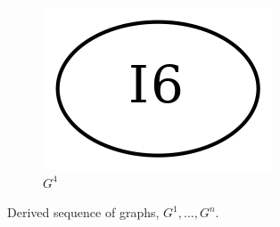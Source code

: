 \documentclass[aspectratio=1610]{beamer}
\begin{document}
\begin{frame}
\begin{figure}[htbp]
\begin{subfigure}[b]{0.06\textwidth}
			\includegraphics[width=\textwidth]{inc/methods/interval/G_4.png}
			\vspace{2em}
			\caption{$G^4$}
		\end{subfigure}
		\caption{Derived sequence of graphs, $G^1, ..., G^n$.}
	\end{figure}
\end{frame}



\end{document}
